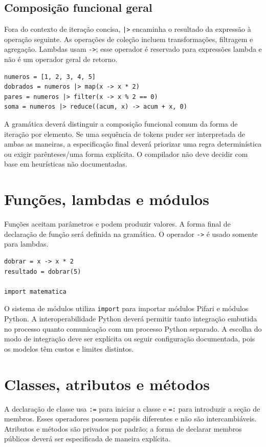 \documentclass[12pt,a4paper]{article}
\begin{document}
\subsection{Composição funcional geral}
Fora do contexto de iteração concisa, \texttt{|>} encaminha o resultado da expressão à operação seguinte. As operações de coleção incluem transformações, filtragem e agregação. Lambdas usam \texttt{->}; esse operador é reservado para expressões lambda e não é um operador geral de retorno.

\begin{lstlisting}
numeros = [1, 2, 3, 4, 5]
dobrados = numeros |> map(x -> x * 2)
pares = numeros |> filter(x -> x % 2 == 0)
soma = numeros |> reduce((acum, x) -> acum + x, 0)
\end{lstlisting}

A gramática deverá distinguir a composição funcional comum da forma de iteração por elemento. Se uma sequência de tokens puder ser interpretada de ambas as maneiras, a especificação final deverá priorizar uma regra determinística ou exigir parênteses/uma forma explícita. O compilador não deve decidir com base em heurísticas não documentadas.

\section{Funções, lambdas e módulos}
Funções aceitam parâmetros e podem produzir valores. A forma final de declaração de função será definida na gramática. O operador \texttt{->} é usado somente para lambdas.

\begin{lstlisting}
dobrar = x -> x * 2
resultado = dobrar(5)

import matematica
\end{lstlisting}

O sistema de módulos utiliza \texttt{import} para importar módulos Pifari e módulos Python. A interoperabilidade Python deverá permitir tanto integração embutida no processo quanto comunicação com um processo Python separado. A escolha do modo de integração deve ser explícita ou seguir configuração documentada, pois os modelos têm custos e limites distintos.

\section{Classes, atributos e métodos}
A declaração de classe usa \texttt{:=} para iniciar a classe e \texttt{=:} para introduzir a seção de membros. Esses operadores possuem papéis diferentes e não são intercambiáveis. Atributos e métodos são privados por padrão; a forma de declarar membros públicos deverá ser especificada de maneira explícita.
\end{document}

